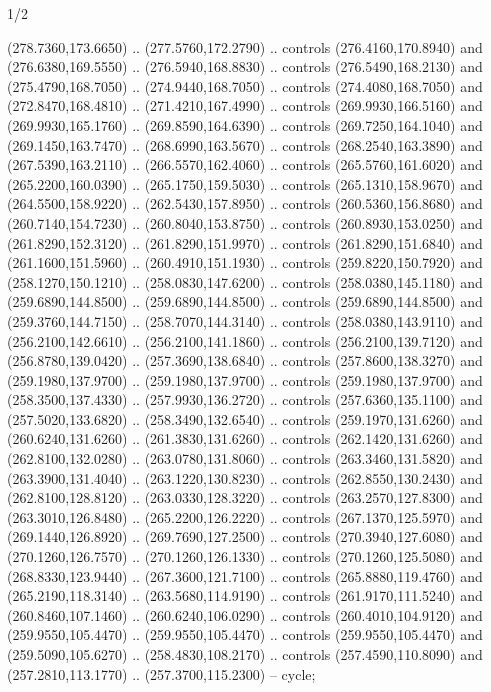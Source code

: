\begin{flagdescription}{1/2}
\begin{scope}[xshift=0.5\flaglength]
\begin{scope}[scale=0.004\flagwidth,xshift=-90mm,yshift=89mm]
\begin{scope}[y=0.80pt, x=0.80pt, yscale=-1, xscale=1, inner sep=0pt, outer sep=0pt]
  (278.7360,173.6650) .. (277.5760,172.2790) .. controls (276.4160,170.8940) and
  (276.6380,169.5550) .. (276.5940,168.8830) .. controls (276.5490,168.2130) and
  (275.4790,168.7050) .. (274.9440,168.7050) .. controls (274.4080,168.7050) and
  (272.8470,168.4810) .. (271.4210,167.4990) .. controls (269.9930,166.5160) and
  (269.9930,165.1760) .. (269.8590,164.6390) .. controls (269.7250,164.1040) and
  (269.1450,163.7470) .. (268.6990,163.5670) .. controls (268.2540,163.3890) and
  (267.5390,163.2110) .. (266.5570,162.4060) .. controls (265.5760,161.6020) and
  (265.2200,160.0390) .. (265.1750,159.5030) .. controls (265.1310,158.9670) and
  (264.5500,158.9220) .. (262.5430,157.8950) .. controls (260.5360,156.8680) and
  (260.7140,154.7230) .. (260.8040,153.8750) .. controls (260.8930,153.0250) and
  (261.8290,152.3120) .. (261.8290,151.9970) .. controls (261.8290,151.6840) and
  (261.1600,151.5960) .. (260.4910,151.1930) .. controls (259.8220,150.7920) and
  (258.1270,150.1210) .. (258.0830,147.6200) .. controls (258.0380,145.1180) and
  (259.6890,144.8500) .. (259.6890,144.8500) .. controls (259.6890,144.8500) and
  (259.3760,144.7150) .. (258.7070,144.3140) .. controls (258.0380,143.9110) and
  (256.2100,142.6610) .. (256.2100,141.1860) .. controls (256.2100,139.7120) and
  (256.8780,139.0420) .. (257.3690,138.6840) .. controls (257.8600,138.3270) and
  (259.1980,137.9700) .. (259.1980,137.9700) .. controls (259.1980,137.9700) and
  (258.3500,137.4330) .. (257.9930,136.2720) .. controls (257.6360,135.1100) and
  (257.5020,133.6820) .. (258.3490,132.6540) .. controls (259.1970,131.6260) and
  (260.6240,131.6260) .. (261.3830,131.6260) .. controls (262.1420,131.6260) and
  (262.8100,132.0280) .. (263.0780,131.8060) .. controls (263.3460,131.5820) and
  (263.3900,131.4040) .. (263.1220,130.8230) .. controls (262.8550,130.2430) and
  (262.8100,128.8120) .. (263.0330,128.3220) .. controls (263.2570,127.8300) and
  (263.3010,126.8480) .. (265.2200,126.2220) .. controls (267.1370,125.5970) and
  (269.1440,126.8920) .. (269.7690,127.2500) .. controls (270.3940,127.6080) and
  (270.1260,126.7570) .. (270.1260,126.1330) .. controls (270.1260,125.5080) and
  (268.8330,123.9440) .. (267.3600,121.7100) .. controls (265.8880,119.4760) and
  (265.2190,118.3140) .. (263.5680,114.9190) .. controls (261.9170,111.5240) and
  (260.8460,107.1460) .. (260.6240,106.0290) .. controls (260.4010,104.9120) and
  (259.9550,105.4470) .. (259.9550,105.4470) .. controls (259.9550,105.4470) and
  (259.5090,105.6270) .. (258.4830,108.2170) .. controls (257.4590,110.8090) and
  (257.2810,113.1770) .. (257.3700,115.2300) -- cycle;

\end{scope}
\end{scope}
\end{scope}
\end{flagdescription}
